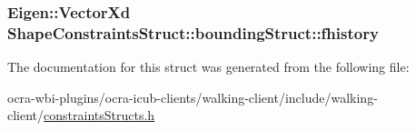 \hypertarget{structShapeConstraintsStruct_1_1boundingStruct_aad4aa0527751939d9d1eb75c1f50b41b}{
\subsubsection[{fhistory}]{\setlength{\rightskip}{0pt plus 5cm}\-Eigen\-::\-Vector\-Xd {\bf \-Shape\-Constraints\-Struct\-::bounding\-Struct\-::fhistory}}}\label{structShapeConstraintsStruct_1_1boundingStruct_aad4aa0527751939d9d1eb75c1f50b41b}


\-The documentation for this struct was generated from the following file\-:\begin{DoxyCompactItemize}
\item 
ocra-\/wbi-\/plugins/ocra-\/icub-\/clients/walking-\/client/include/walking-\/client/\hyperlink{constraintsStructs_8h}{constraints\-Structs.\-h}\end{DoxyCompactItemize}
